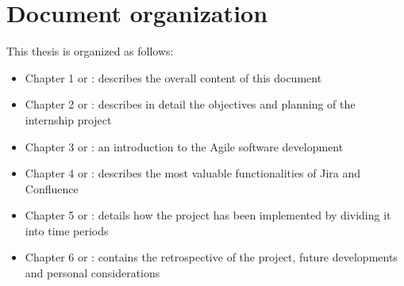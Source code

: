 \section{Document organization}
	This thesis is organized as follows:
	\begin{itemize}
		\item Chapter 1 or : describes the overall content of this document
		\item Chapter 2 or : describes in detail the objectives and planning of the internship project
		\item Chapter 3 or : an introduction to the Agile software development
		\item Chapter 4 or : describes the most valuable functionalities of Jira and Confluence
		\item Chapter 5 or : details how the project has been implemented by dividing it into time periods
		\item Chapter 6 or : contains the retrospective of the project, future developments and personal considerations
	\end{itemize}
	
